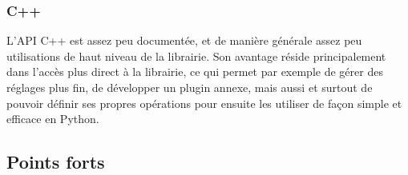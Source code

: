 \subsubsection{C++}

L'API C++ est assez peu documentée, et de manière générale assez peu utilisations de haut niveau de la librairie. Son avantage réside principalement dans l'accès plus direct à la librairie, ce qui permet par exemple de gérer des réglages plus fin, de développer un plugin annexe, mais aussi et surtout de pouvoir définir ses propres opérations pour ensuite les utiliser de façon simple et efficace en Python.

\subsection{Points forts}

